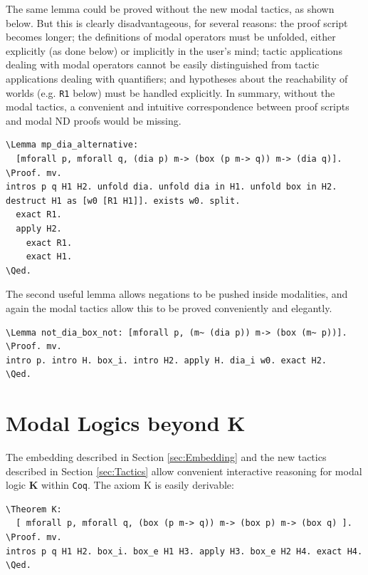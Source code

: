 \documentclass{llncs}
\newcommand{\red}[1]{\textcolor[rgb]{1,0,0}{#1}}
\newcommand{\blue}[1]{\textcolor[rgb]{0,0,1}{#1}}
\newcommand{\Lemma}{\red{Lemma}}
\newcommand{\Theorem}{\red{Theorem}}
\newcommand{\Proof}{\blue{Proof}}
\newcommand{\Qed}{\blue{Qed}}
\newcommand{\Coq}{\texttt{Coq}\xspace}
\begin{document}
\noindent
The same lemma could be proved without the new modal tactics, as shown below.
But this is clearly disadvantageous, for several reasons: 
the proof script becomes longer;
the definitions of modal operators must be unfolded, 
either explicitly (as done below) or implicitly in the user's mind; 
tactic applications dealing with modal operators cannot be easily distinguished
from tactic applications dealing with quantifiers; and  
hypotheses about the reachability of worlds (e.g. \texttt{R1} below) 
must be handled explicitly. In summary, without the modal tactics, 
a convenient and intuitive correspondence between proof scripts and 
modal ND proofs would be missing.

\begin{Verbatim}[commandchars=\\\{\},fontsize=\verbsize]
\Lemma mp_dia_alternative: 
  [mforall p, mforall q, (dia p) m-> (box (p m-> q)) m-> (dia q)].
\Proof. mv. 
intros p q H1 H2. unfold dia. unfold dia in H1. unfold box in H2.
destruct H1 as [w0 [R1 H1]]. exists w0. split.
  exact R1.
  apply H2.
    exact R1.
    exact H1.
\Qed.
\end{Verbatim}


\noindent
The second useful lemma allows negations to be pushed inside modalities, 
and again the modal tactics allow this to be proved conveniently and elegantly.

\begin{Verbatim}[commandchars=\\\{\},fontsize=\verbsize]
\Lemma not_dia_box_not: [mforall p, (m~ (dia p)) m-> (box (m~ p))].
\Proof. mv. 
intro p. intro H. box_i. intro H2. apply H. dia_i w0. exact H2. 
\Qed.
\end{Verbatim}


\section{Modal Logics beyond K}
\label{sec:BeyondK}

The embedding described in Section \ref{sec:Embedding} and the 
new tactics described in Section \ref{sec:Tactics} allow convenient 
interactive reasoning for modal logic \textbf{K} within \Coq. 
The axiom K is easily derivable:

\begin{Verbatim}[commandchars=\\\{\},fontsize=\verbsize]
\Theorem K: 
  [ mforall p, mforall q, (box (p m-> q)) m-> (box p) m-> (box q) ].
\Proof. mv. 
intros p q H1 H2. box_i. box_e H1 H3. apply H3. box_e H2 H4. exact H4. 
\Qed.
\end{Verbatim}
\end{document}
